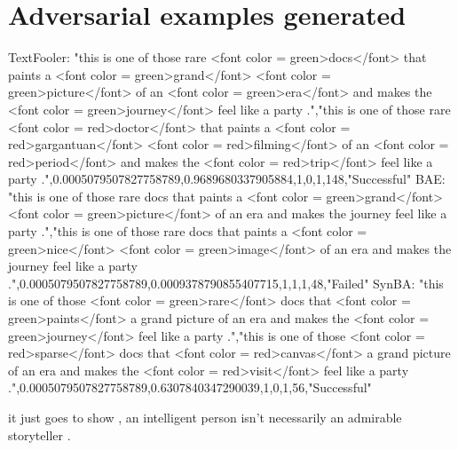 \section{Adversarial examples generated}\label{sec:adversarial-examples-generated}

TextFooler: "this is one of those rare <font color = green>docs</font> that paints a <font color = green>grand</font> <font color = green>picture</font> of an <font color = green>era</font> and makes the <font color = green>journey</font> feel like a party .","this is one of those rare <font color = red>doctor</font> that paints a <font color = red>gargantuan</font> <font color = red>filming</font> of an <font color = red>period</font> and makes the <font color = red>trip</font> feel like a party .",0.0005079507827758789,0.9689680337905884,1,0,1,148,"Successful"
BAE: "this is one of those rare docs that paints a <font color = green>grand</font> <font color = green>picture</font> of an era and makes the journey feel like a party .","this is one of those rare docs that paints a <font color = green>nice</font> <font color = green>image</font> of an era and makes the journey feel like a party .",0.0005079507827758789,0.0009378790855407715,1,1,1,48,"Failed"
SynBA: "this is one of those <font color = green>rare</font> docs that <font color = green>paints</font> a grand picture of an era and makes the <font color = green>journey</font> feel like a party .","this is one of those <font color = red>sparse</font> docs that <font color = red>canvas</font> a grand picture of an era and makes the <font color = red>visit</font> feel like a party .",0.0005079507827758789,0.6307840347290039,1,0,1,56,"Successful"



it just goes to show , an intelligent person isn't necessarily an admirable storyteller .